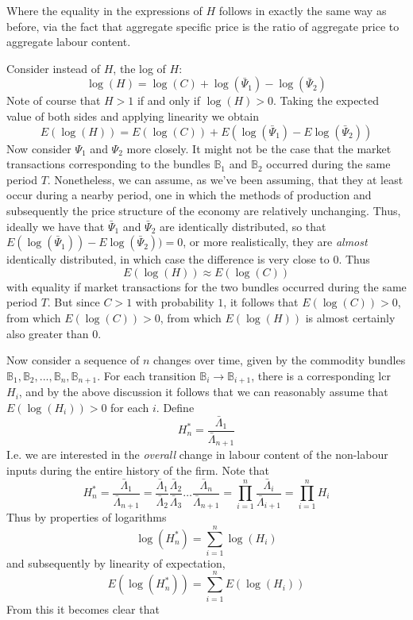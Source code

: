 Where the equality in the expressions of $H$ follows in exactly the same way as before, via the fact that aggregate specific price is the ratio of aggregate price to aggregate labour content. \par 
Consider instead of $H$, the log of $H$:
\[ \log(H) = \log(C) + \log(\bar{\Psi}_1) - \log(\bar{\Psi}_2) \]
Note of course that $H > 1$ if and only if $\log(H) > 0$. Taking the expected value of both sides and applying linearity we obtain
\[ E(\log(H)) = E(\log(C)) + E(\log(\bar{\Psi}_1) - E\log(\bar{\Psi}_2)) \]
Now consider $\Psi_1$ and $\Psi_2$ more closely. It might not be the case that the market transactions corresponding to the bundles $\mathbb{B}_1$ and $\mathbb{B}_2$ occurred during the same period $T$. Nonetheless, we can assume, as we've been assuming, that they at least occur during a nearby period, one in which the methods of production and subsequently the price structure of the economy are relatively unchanging. Thus, ideally we have that $\bar{\Psi}_1$ and $\bar{\Psi}_2$ are identically distributed, so that $E(\log(\bar{\Psi}_1)) - E\log(\bar{\Psi}_2)) = 0$, or more realistically, they are \textit{almost} identically distributed, in which case the difference is very close to $0$. Thus
\[ E(\log(H)) \approx E(\log(C)) \]
with equality if market transactions for the two bundles occurred during the same period $T$. But since $C > 1$ with probability $1$, it follows that $E(\log(C)) > 0$, from which $E(\log(C)) > 0$, from which $E(\log(H))$ is almost certainly also greater than $0$. \par 
Now consider a sequence of $n$ changes over time, given by the commodity bundles $\mathbb{B}_1,\mathbb{B}_2,...,\mathbb{B}_n,\mathbb{B}_{n+1}$. For each transition $\mathbb{B}_i \to \mathbb{B}_{i+1}$, there is a corresponding lcr $H_i$, and by the above discussion it follows that we can reasonably assume that $E(\log(H_i)) > 0$ for each $i$. Define 
\[ H^*_n = \frac{\bar{\Lambda}_1}{\bar{\Lambda}_{n+1}} \]
I.e. we are interested in the \textit{overall} change in labour content of the non-labour inputs during the entire history of the firm. Note that 
\[ H^*_n = \frac{\bar{\Lambda}_1}{\bar{\Lambda}_{n+1}} = \frac{\bar{\Lambda}_1}{\bar{\Lambda}_2}\frac{\bar{\Lambda}_2}{\bar{\Lambda}_3}\ldots \frac{\bar{\Lambda}_n}{\bar{\Lambda}_{n+1}} = \prod_{i=1}^n \frac{\bar{\Lambda}_i}{\bar{\Lambda}_{i+1}} = \prod_{i=1}^n H_i \]
Thus by properties of logarithms
\[ \log(H^*_n) = \sum_{i=1}^n \log(H_i) \]
and subsequently by linearity of expectation,
\[ E(\log(H^*_n)) = \sum_{i=1}^n E(\log(H_i)) \]
From this it becomes clear that 
